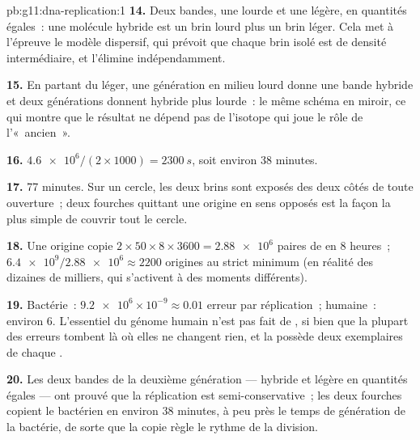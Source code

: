 \begin{solution}{pb:g11:dna-replication:1}
\textbf{14.} Deux bandes, une lourde et une légère, en quantités
égales~: une molécule hybride est un brin lourd plus un brin léger.
Cela met à l'épreuve le modèle dispersif, qui prévoit que chaque brin
isolé est de densité intermédiaire, et l'élimine indépendamment.

\textbf{15.} En partant du léger, une génération en milieu lourd donne
une bande hybride et deux générations donnent hybride plus lourde~: le
même schéma en miroir, ce qui montre que le résultat ne dépend pas de
l'isotope qui joue le rôle de l'«~ancien~».

\textbf{16.} $\num{4.6e6}/(2 \times 1000) = \qty{2300}{s}$, soit
environ 38 minutes.

\textbf{17.} 77 minutes. Sur un cercle, les deux brins sont exposés des
deux côtés de toute ouverture~; deux fourches quittant une origine en
sens opposés est la façon la plus simple de couvrir tout le cercle.

\textbf{18.} Une origine copie $2 \times 50 \times 8 \times 3600 =
\num{2.88e6}$ paires de  en 8 heures~; $\num{6.4e9}/\num{2.88e6}
\approx 2200$ origines au strict minimum (en réalité des dizaines de
milliers, qui s'activent à des moments différents).

\textbf{19.} Bactérie~: $\num{9.2e6} \times 10^{-9} \approx 0.01$
erreur par réplication~;  humaine~: environ 6. L'essentiel du
génome humain n'est pas fait de , si bien que la plupart des
erreurs tombent là où elles ne changent rien, et la  possède
deux exemplaires de chaque .

\textbf{20.} Les deux bandes de la deuxième génération --- hybride et
légère en quantités égales --- ont prouvé que la réplication est
semi-conservative~; les deux fourches copient le  bactérien
en environ 38 minutes, à peu près le temps de génération de la
bactérie, de sorte que la copie règle le rythme de la division.
\end{solution}
